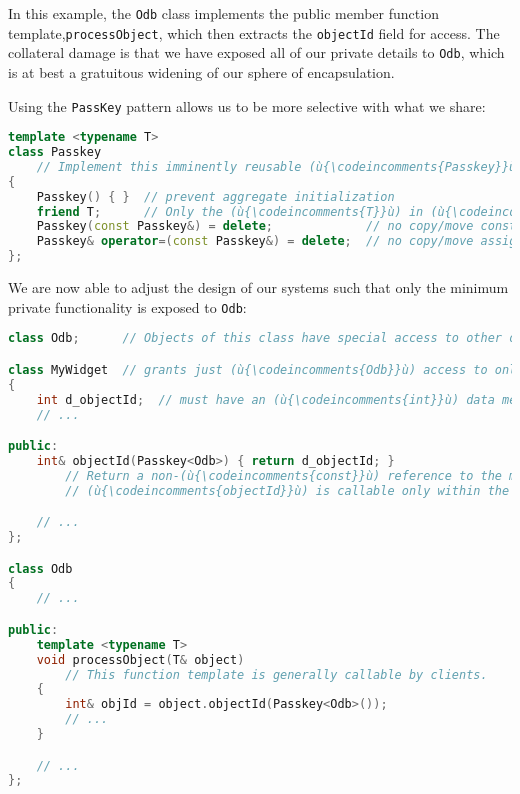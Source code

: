 \noindent In this example, the \texttt{Odb} class implements the public member
function template,\linebreak[4] \texttt{processObject}, which then extracts the
\texttt{objectId} field for access. The collateral damage is that we
have exposed all of our private details to \texttt{Odb}, which is at
best a gratuitous widening of our sphere of encapsulation.

Using the \texttt{PassKey} pattern allows us to be more selective with
what we share:

\begin{lstlisting}[language=C++]
template <typename T>
class Passkey
    // Implement this imminently reusable (ù{\codeincomments{Passkey}}ù) class template again here.
{
    Passkey() { }  // prevent aggregate initialization
    friend T;      // Only the (ù{\codeincomments{T}}ù) in (ù{\codeincomments{PassKey<T>}}ù) can create a (ù{\codeincomments{PassKey}}ù) object.
    Passkey(const Passkey&) = delete;             // no copy/move construction
    Passkey& operator=(const Passkey&) = delete;  // no copy/move assignment
};
\end{lstlisting}

\noindent We are now able to adjust the design of our systems such that only the
minimum private functionality is exposed to \texttt{Odb}:

\begin{lstlisting}[language=C++]
class Odb;      // Objects of this class have special access to other objects.

class MyWidget  // grants just (ù{\codeincomments{Odb}}ù) access to only its (ù{\codeincomments{objectId}}ù) member function
{
    int d_objectId;  // must have an (ù{\codeincomments{int}}ù) data member of any name we choose
    // ...

public:
    int& objectId(Passkey<Odb>) { return d_objectId; }
        // Return a non-(ù{\codeincomments{const}}ù) reference to the mandated (ù{\codeincomments{int}}ù) data member.
        // (ù{\codeincomments{objectId}}ù) is callable only within the scope of (ù{\codeincomments{Odb}}ù).

    // ...
};

class Odb
{
    // ...

public:
    template <typename T>
    void processObject(T& object)
        // This function template is generally callable by clients.
    {
        int& objId = object.objectId(Passkey<Odb>());
        // ...
    }

    // ...
};
\end{lstlisting}

